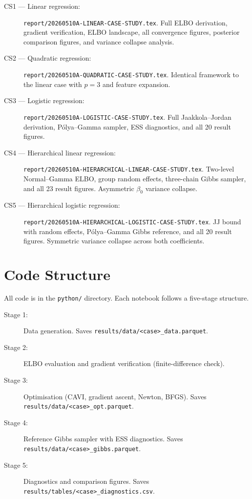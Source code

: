 \documentclass[11pt,a4paper]{article}
\begin{document}
\begin{description}
  \item[CS1 --- Linear regression:] \texttt{report/20260510A-LINEAR-CASE-STUDY.tex}.
    Full ELBO derivation, gradient verification, ELBO landscape, all convergence
    figures, posterior comparison figures, and variance collapse analysis.
  \item[CS2 --- Quadratic regression:] \texttt{report/20260510A-QUADRATIC-CASE-STUDY.tex}.
    Identical framework to the linear case with $p=3$ and feature expansion.
  \item[CS3 --- Logistic regression:] \texttt{report/20260510A-LOGISTIC-CASE-STUDY.tex}.
    Full Jaakkola--Jordan derivation, P\'{o}lya--Gamma sampler, ESS diagnostics,
    and all 20 result figures.
  \item[CS4 --- Hierarchical linear regression:] \texttt{report/20260510A-HIERARCHICAL-LINEAR-CASE-STUDY.tex}.
    Two-level Normal--Gamma ELBO, group random effects, three-chain Gibbs sampler,
    and all 23 result figures. Asymmetric $\beta_0$ variance collapse.
  \item[CS5 --- Hierarchical logistic regression:] \texttt{report/20260510A-HIERARCHICAL-LOGISTIC-CASE-STUDY.tex}.
    JJ bound with random effects, P\'{o}lya--Gamma Gibbs reference,
    and all 20 result figures. Symmetric variance collapse across both coefficients.
\end{description}

\section{Code Structure}
\label{app:code}

All code is in the \texttt{python/} directory.
Each notebook follows a five-stage structure.

\begin{description}
  \item[Stage 1:] Data generation. Saves \texttt{results/data/<case>\_data.parquet}.
  \item[Stage 2:] ELBO evaluation and gradient verification (finite-difference check).
  \item[Stage 3:] Optimisation (CAVI, gradient ascent, Newton, BFGS).
    Saves \texttt{results/data/<case>\_opt.parquet}.
  \item[Stage 4:] Reference Gibbs sampler with ESS diagnostics.
    Saves \texttt{results/data/<case>\_gibbs.parquet}.
  \item[Stage 5:] Diagnostics and comparison figures.
    Saves \texttt{results/tables/<case>\_diagnostics.csv}.
\end{description}
\end{document}

